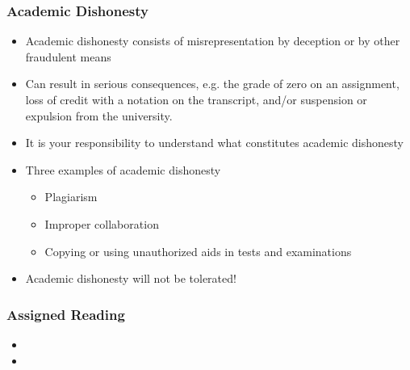 \documentclass[t,12pt,numbers,fleqn]{beamer}
\begin{document}
\begin{frame}
\frametitle{Academic Dishonesty}

\begin {itemize}

\item Academic dishonesty consists of misrepresentation by deception or by other fraudulent means
\item Can result in serious consequences, e.g. the grade of zero on an assignment, loss of credit with a notation on
the transcript, and/or suspension or expulsion from the university.
\item It is your responsibility to understand what constitutes academic dishonesty
\item Three examples of academic dishonesty
\begin{itemize}
\item Plagiarism
\item Improper collaboration
\item Copying or using unauthorized aids in tests and examinations
\end{itemize}
\item Academic dishonesty will not be tolerated!
\end{itemize}

\end{frame}


\begin{frame}
\frametitle{Assigned Reading}

\begin {itemize}

\item {}
\item {}

\end{itemize}

\end{frame}

\end{document}
